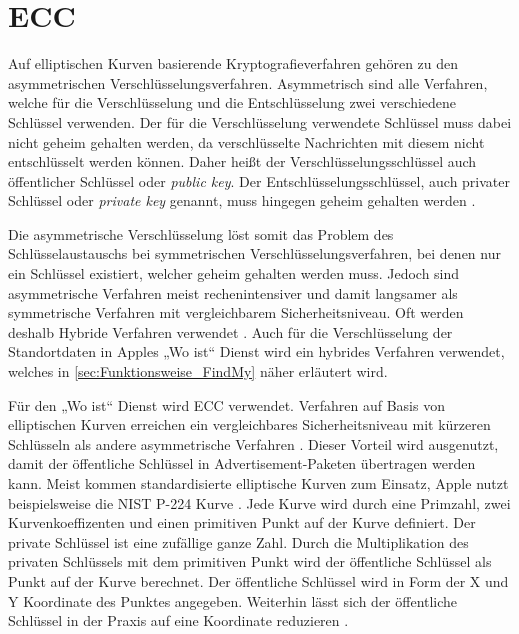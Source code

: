 \section{\ac{ECC}}
\label{sec:ecc}
Auf elliptischen Kurven basierende Kryptografieverfahren gehören zu den asymmetrischen Verschlüsselungsverfahren.
Asymmetrisch sind alle Verfahren, welche für die Verschlüsselung und die Entschlüsselung zwei verschiedene Schlüssel verwenden.
Der für die Verschlüsselung verwendete Schlüssel muss dabei nicht geheim gehalten werden, da verschlüsselte Nachrichten mit diesem nicht entschlüsselt werden können.
Daher heißt der Verschlüsselungsschlüssel auch öffentlicher Schlüssel oder \textit{public key}.
Der Entschlüsselungsschlüssel, auch privater Schlüssel oder \textit{private key} genannt, muss hingegen geheim gehalten werden \cite[S. 173ff.]{Krypto}.

Die asymmetrische Verschlüsselung löst somit das Problem des Schlüsselaustauschs bei symmetrischen Verschlüsselungsverfahren, bei denen nur ein Schlüssel existiert, welcher geheim gehalten werden muss.
Jedoch sind asymmetrische Verfahren meist rechenintensiver und damit langsamer als symmetrische Verfahren mit vergleichbarem Sicherheitsniveau.
Oft werden deshalb Hybride Verfahren verwendet \cite[S. 178f.]{Krypto}.
Auch für die Verschlüsselung der Standortdaten in Apples „Wo ist“ Dienst wird ein hybrides Verfahren verwendet, welches in \autoref{sec:Funktionsweise_FindMy} näher erläutert wird.

Für den „Wo ist“ Dienst wird \ac{ECC} verwendet.
Verfahren auf Basis von elliptischen Kurven erreichen ein vergleichbares Sicherheitsniveau mit kürzeren Schlüsseln als andere asymmetrische Verfahren \cite[S. 273.]{Krypto}.
Dieser Vorteil wird ausgenutzt, damit der öffentliche Schlüssel in Advertisement-Paketen übertragen werden kann.
Meist kommen standardisierte elliptische Kurven zum Einsatz, Apple nutzt beispielsweise die NIST P-224 Kurve \cite{Heinrich_FindMy}.
Jede Kurve wird durch eine Primzahl, zwei Kurvenkoeffizenten und einen primitiven Punkt auf der Kurve definiert.
Der private Schlüssel ist eine zufällige ganze Zahl.
Durch die Multiplikation des privaten Schlüssels mit dem primitiven Punkt wird der öffentliche Schlüssel als Punkt auf der Kurve berechnet.
Der öffentliche Schlüssel wird in Form der X und Y Koordinate des Punktes angegeben.
Weiterhin lässt sich der öffentliche Schlüssel in der Praxis auf eine Koordinate reduzieren \cite[S. 284f.]{Krypto}.

